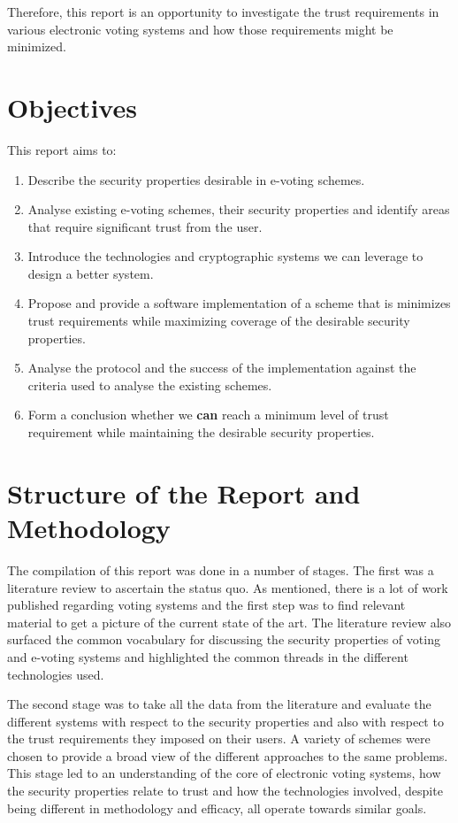 Therefore, this report is an opportunity to investigate the trust requirements in various electronic voting systems and how those requirements might be minimized.


\section{Objectives}
\label{ch:intro:object}

This report aims to:

\begin{enumerate}
    \item Describe the security properties desirable in e-voting schemes.
    \item Analyse existing e-voting schemes, their security properties and identify areas that require significant trust from the user.
    \item Introduce the technologies and cryptographic systems we can leverage to design a better system.
    \item Propose and provide a software implementation of a scheme that is minimizes trust requirements while maximizing coverage of the desirable security properties.
    \item Analyse the protocol and the success of the implementation against the criteria used to analyse the existing schemes.
    \item Form a conclusion whether we {\textbf{can}} reach a minimum level of trust requirement while maintaining the desirable security properties.
\end{enumerate}


\section{Structure of the Report and Methodology}
\label{ch:intro:method}

The compilation of this report was done in a number of stages. The first was a literature review to ascertain the status quo. As mentioned, there is a lot of work published regarding voting systems and the first step was to find relevant material to get a picture of the current state of the art. The literature review also surfaced the common vocabulary for discussing the security properties of voting and e-voting systems and highlighted the common threads in the different technologies used.

The second stage was to take all the data from the literature and evaluate the different systems with respect to the security properties and also with respect to the trust requirements they imposed on their users. A variety of schemes were chosen to provide a broad view of the different approaches to the same problems.
This stage led to an understanding of the core of electronic voting systems, how the security properties relate to trust and how the technologies involved, despite being different in methodology and efficacy, all operate towards similar goals.


